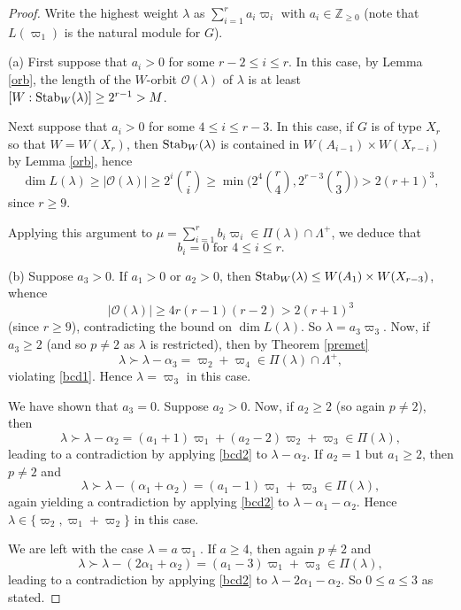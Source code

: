 \documentclass[11pt]{amsart}
\theoremstyle{plain}
\theoremstyle{definition}
\numberwithin{thm}{section}
\numberwithin{equation}{thm}
\newcommand{\al}{\alpha}
\newcommand{\om}{\varpi}
\newcommand{\Stab}{{\rm Stab}}
\newcommand{\sO}{{\mathcal O}}
\newcommand{\Z}{{\mathbb Z}}
\newcommand{\0}{\emptyset}
\newcommand{\LP}{{\Lambda^{+}}}
\newcommand{\lam}{\lambda}
\begin{document}
\begin{proof}
Write the highest weight $\lam$ as $\sum^r_{i=1}a_i\om_i$ with $a_i \in \Z_{\geq 0}$ (note that $L(\om_1)$ is the natural module
for $G$).  

\smallskip
(a) First suppose that $a_i > 0$ for some $r-2 \leq i \leq r$. In this case, by Lemma \ref{orb}, the length of the $W$-orbit 
$\sO(\lam)$ of $\lam$ is 
at least $[W:\Stab_W(\lam)] \geq 2^{r-1} > M$.

Next suppose that $a_i > 0$ for some $4 \leq i \leq r-3$. In this case, if $G$ is of type $X_r$ so that $W=W(X_r)$, then
$\Stab_W(\lam)$ is contained in $W(A_{i-1}) \times W(X_{r-i})$ by Lemma \ref{orb}, hence
$$\dim L(\lam) \geq |\sO(\lam)| \geq 2^i \binom{r}{i} \geq \min\bigl( 2^4 \binom{r}{4},2^{r-3}\binom{r}{3} \bigr) > 2(r+1)^3,$$
since $r \geq 9$. 

Applying this argument to $\mu = \sum^r_{i=1}b_i\om_i \in \Pi(\lam) \cap \LP$, %
we deduce that
\begin{equation}\label{bcd1}
  b_i =0 \mbox{ for } 4 \leq i \leq r.
\end{equation} 

\smallskip
(b) Suppose $a_3 > 0$. If $a_1 > 0$ or $a_2 > 0$, then $\Stab_W(\lam) \leq W(A_1) \times W(X_{r-3})$, whence 
\begin{equation}\label{bcd2}
  |\sO(\lam)| \geq 4r(r-1)(r-2) > 2(r+1)^3
\end{equation}  
(since $r \geq 9$), contradicting the bound on $\dim L(\lam)$. So $\lam=a_3\om_3$. Now, if $a_3 \geq 2$ (and so $p \neq 2$ 
as $\lam$ is restricted), then by Theorem \ref{premet} %
$$\lam \succ \lam-\al_3 = \om_2+\om_4 \in \Pi(\lam) \cap \LP,$$ 
violating \eqref{bcd1}. Hence $\lam=\om_3$ in this case.

We have shown that $a_3=0$. Suppose $a_2 > 0$. Now, if $a_2 \geq 2$ (so again $p \neq 2$), then 
$$\lam \succ \lam-\al_2 = (a_1+1)\om_1 + (a_2-2)\om_2+\om_3 \in \Pi(\lam),$$
leading to a contradiction by applying \eqref{bcd2} to $\lam-\al_2$. If $a_2=1$ but $a_1 \geq 2$, then $p \neq 2$ 
and 
$$\lam \succ \lam-(\al_1+\al_2) = (a_1-1)\om_1 + \om_3 \in \Pi(\lam),$$
again yielding a contradiction by applying \eqref{bcd2} to $\lam-\al_1-\al_2$.  Hence $\lam \in \{\om_2,\om_1+\om_2\}$ in 
this case.

We are left with the case $\lam = a\om_1$. If $a \geq 4$, then again $p \neq 2$ and 
$$\lam \succ \lam-(2\al_1+\al_2) = (a_1-3)\om_1 +\om_3 \in \Pi(\lam),$$
leading to a contradiction by applying \eqref{bcd2} to $\lam-2\al_1-\al_2$. So $0 \leq a \leq 3$ as stated.


\end{proof}
\end{document}
